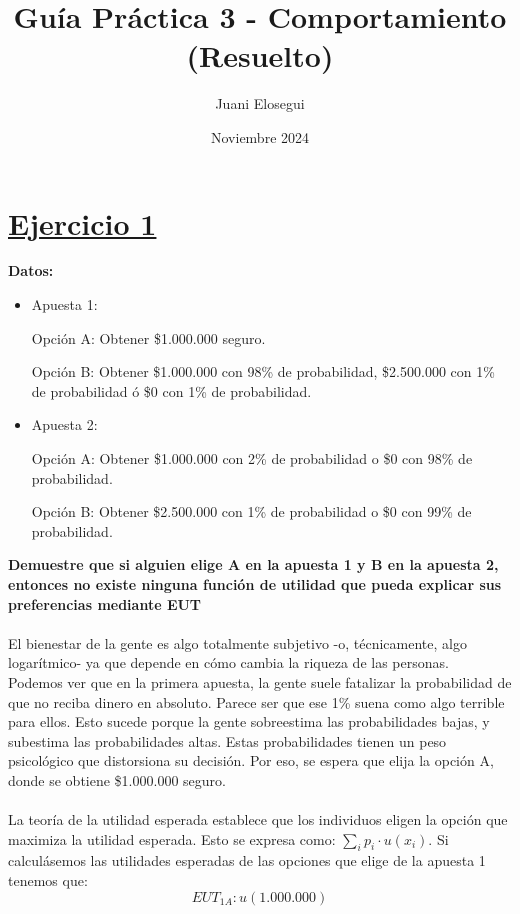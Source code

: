 \documentclass{article}
\title{Guía Práctica 3 - Comportamiento (Resuelto)}
\author{Juani Elosegui}
\date{Noviembre 2024}
\begin{document}
    
    \maketitle

    \section*{\underline{Ejercicio 1}}
        \textbf{Datos:}
        \begin{itemize}
            \item Apuesta 1:
            
            Opción A: Obtener \$1.000.000 seguro. 
            
            Opción B: Obtener \$1.000.000 con 98\% de probabilidad, \$2.500.000 con 1\% de probabilidad ó \$0 con 1\% de probabilidad.
            \item Apuesta 2:

            Opción A: Obtener \$1.000.000 con 2\% de probabilidad o \$0 con 98\% de probabilidad.

            Opción B: Obtener \$2.500.000 con 1\% de probabilidad o \$0 con 99\% de probabilidad.
        \end{itemize}
        \textbf{Demuestre que si alguien elige A en la apuesta 1 y B en la apuesta 2, entonces no existe ninguna función de utilidad que pueda explicar sus preferencias mediante EUT}
        \\
        \\
        El bienestar de la gente es algo totalmente subjetivo -o, técnicamente, algo logarítmico- ya que depende en cómo cambia la riqueza de las personas.
        \\
        Podemos ver que en la primera apuesta, la gente suele fatalizar la probabilidad de que no reciba dinero en absoluto. Parece ser que ese 1\% suena como algo terrible para ellos. Esto sucede porque la gente sobreestima las probabilidades bajas, y subestima las probabilidades altas. Estas probabilidades tienen un peso psicológico que distorsiona su decisión. Por eso, se espera que elija la opción A, donde se obtiene \$1.000.000 seguro.
        \\
        \\
        La teoría de la utilidad esperada establece que los individuos eligen la opción que maximiza la utilidad esperada. Esto se expresa como: \(\sum_{i}p_{i} \cdot u(x_{i})\). Si calculásemos las utilidades esperadas de las opciones que elige de la apuesta 1 tenemos que:
        \[EUT_{1A}:u(1.000.000)\]
\end{document}
